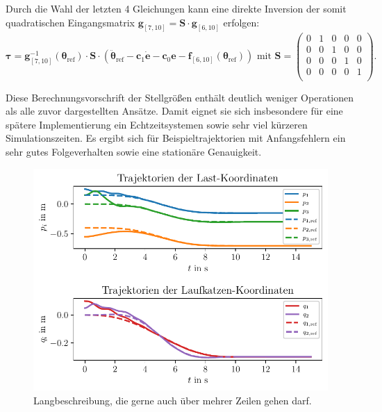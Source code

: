 Durch die Wahl der letzten 4 Gleichungen kann eine direkte Inversion der somit quadratischen Eingangsmatrix $\mathbf{g}_{[7, 10]} = \mathbf{S} \cdot \mathbf{g}_{[6, 10]}$ erfolgen:
\begin{equation}
	\boldsymbol{\tau}= \mathbf{g}^{-1}_{[7, 10]}(\boldsymbol{\theta}_{\text{ref}}) \cdot \mathbf{S} \cdot (\ddot{\boldsymbol{\theta}}_{\text{ref}} - \mathbf{c}_{1} \mathbf{\dot{e}} - \mathbf{c}_{0} \mathbf{e} - \mathbf{f}_{[6, 10]}(\boldsymbol{\theta}_{\text{ref}})) \text{ mit } 
	\mathbf{S} = 
	\begin{pmatrix}
	0 & 1 & 0 & 0 & 0 \\
	0 & 0 & 1 & 0 & 0 \\
	0 & 0 & 0 & 1 & 0 \\
	0 & 0 & 0 & 0 & 1 \\
	\end{pmatrix}.
\end{equation}

Diese Berechnungsvorschrift der Stellgrößen enthält deutlich weniger Operationen als alle zuvor dargestellten Ansätze. Damit eignet sie sich insbesondere für eine spätere Implementierung ein Echtzeitsystemen sowie sehr viel kürzeren Simulationszeiten. Es ergibt sich für Beispieltrajektorien mit Anfangsfehlern ein sehr gutes Folgeverhalten sowie eine stationäre Genauigkeit.

\begin{figure}[ht]
	\begin{center}
		\includegraphics[scale=1]{Pictures/feedforward_lin_selec_controller_initial_error}
	\end{center}
	\caption[Kurzbeschreibung für Abbildungsverzeichnis]
	{Langbeschreibung, die gerne auch über mehrer Zeilen gehen darf.}
	\label{fig_feedforward_selec_controller_initial_error}
\end{figure}

